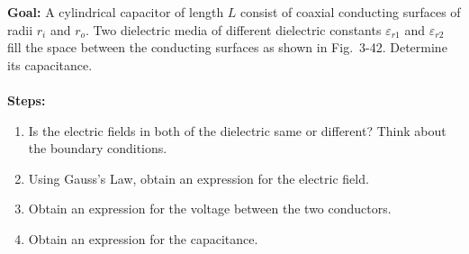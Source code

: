 \documentclass[../../header.tex]{subfiles}
\begin{document}
\textbf{Goal:} A cylindrical capacitor of length $L$ consist of coaxial conducting surfaces of radii $r_i$ and $r_o$. Two dielectric media of different dielectric constants $\varepsilon_{r1}$ and $\varepsilon_{r2}$ fill the space between the conducting surfaces as shown in Fig.~3-42. Determine its capacitance.\\
\\
\textbf{Steps:} 
\begin{enumerate}
\item Is the electric fields in both of the dielectric same or different? Think about the boundary conditions.


\item Using Gauss's Law, obtain an expression for the electric field.


\item Obtain an expression for the voltage between the two conductors.


\item Obtain an expression for the capacitance.


\end{enumerate}
\end{document}
